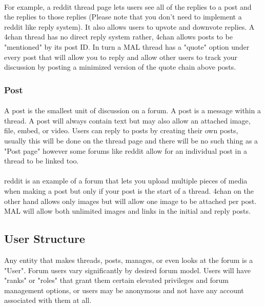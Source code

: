 \documentclass[]{article}
\begin{document}
\paragraph{}
For example, a reddit thread page lets users see all of the replies to a post and the replies to those replies (Please note that you don't need to implement a reddit like reply system). It also allows users to upvote and downvote replies. A 4chan thread has no direct reply system rather, 4chan allows posts to be "mentioned" by its post ID. In turn a MAL thread has a "quote" option under every post that will allow you to reply and allow other users to track your discussion by posting a minimized version of the quote chain above posts.    

\subsubsection{Post}\label{post}
\paragraph{}
A post is the smallest unit of discussion on a forum. A post is a message within a thread. A post will always contain text but may also allow an attached image, file, embed, or video. Users can reply to posts by creating their own posts, usually this will be done on the thread page and there will be no such thing as a "Post page" however some forums like reddit allow for an individual post in a thread to be linked too. 
\paragraph{}
reddit is an example of a forum that lets you upload multiple pieces of media when making a post but only if your post is the start of a thread. 4chan on the other hand allows only images but will allow one image to  be attached per post. MAL will allow both unlimited images and links in the initial and reply posts.

\subsection{User Structure}
Any entity that makes threads, posts, manages, or even looks at the forum is a "User". Forum users vary significantly by desired forum model. Users will have "ranks" or "roles" that grant them certain elevated privileges and forum management options, or users may be anonymous and not have any account associated with them at all. 
\end{document}
